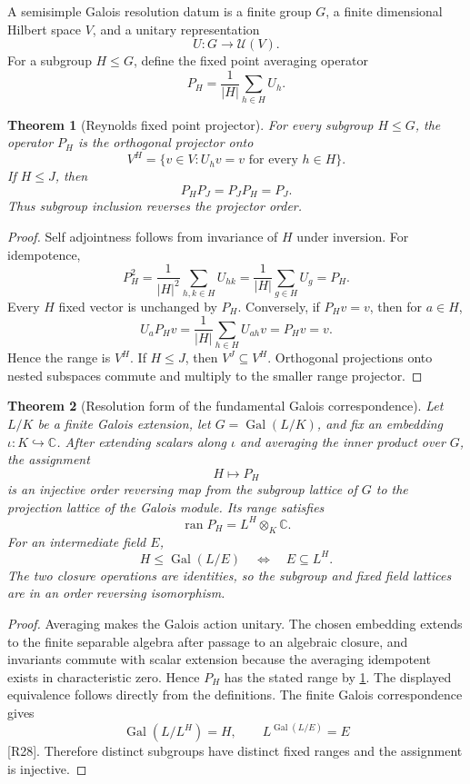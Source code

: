 \documentclass{aomart}
\newtheorem{theorem}{Theorem}[section]
\theoremstyle{definition}
\theoremstyle{remark}
\newcommand{\CC}{\mathbb C}
\newcommand{\ran}{\operatorname{ran}}
\newcommand{\Gal}{\operatorname{Gal}}
\newcommand{\Rcite}[1]{\textup{[#1]}}
\begin{document}
\begin{definition}\label{def:galois_resolution_datum}
A semisimple Galois resolution datum is a finite group \(G\), a finite dimensional Hilbert space \(V\), and a unitary representation
\[
 U:G\longrightarrow\mathcal U(V).
\]
For a subgroup \(H\leq G\), define the fixed point averaging operator
\[
 \boxed{
 P_H
 =
 \frac1{|H|}\sum_{h\in H}U_h.
 }
\]
\end{definition}

\begin{theorem}[Reynolds fixed point projector]\label{thm:reynolds_projector}
For every subgroup \(H\leq G\), the operator \(P_H\) is the orthogonal projector onto
\[
 V^H
 =
 \{v\in V:U_hv=v\text{ for every }h\in H\}.
\]
If \(H\leq J\), then
\[
 \boxed{
 P_HP_J=P_JP_H=P_J.
 }
\]
Thus subgroup inclusion reverses the projector order.
\end{theorem}

\begin{proof}
Self adjointness follows from invariance of \(H\) under inversion. For idempotence,
\[
 P_H^2
 =
 \frac1{|H|^2}\sum_{h,k\in H}U_{hk}
 =
 \frac1{|H|}\sum_{g\in H}U_g
 =P_H.
\]
Every \(H\) fixed vector is unchanged by \(P_H\). Conversely, if \(P_Hv=v\), then for \(a\in H\),
\[
 U_aP_Hv
 =
 \frac1{|H|}\sum_{h\in H}U_{ah}v
 =P_Hv=v.
\]
Hence the range is \(V^H\). If \(H\leq J\), then \(V^J\subseteq V^H\). Orthogonal projections onto nested subspaces commute and multiply to the smaller range projector.
\end{proof}

\begin{theorem}[Resolution form of the fundamental Galois correspondence]\label{thm:resolution_galois_correspondence}
Let \(L/K\) be a finite Galois extension, let \(G=\Gal(L/K)\), and fix an embedding \(\iota:K\hookrightarrow\CC\). After extending scalars along \(\iota\) and averaging the inner product over \(G\), the assignment
\[
 \boxed{
 H\longmapsto P_H
 }
\]
is an injective order reversing map from the subgroup lattice of \(G\) to the projection lattice of the Galois module. Its range satisfies
\[
 \boxed{
 \ran P_H
 =
 L^H\otimes_K\CC.
 }
\]
For an intermediate field \(E\),
\[
 \boxed{
 H\leq\Gal(L/E)
 \quad\Longleftrightarrow\quad
 E\subseteq L^H.
 }
\]
The two closure operations are identities, so the subgroup and fixed field lattices are in an order reversing isomorphism.
\end{theorem}

\begin{proof}
Averaging makes the Galois action unitary. The chosen embedding extends to the finite separable algebra after passage to an algebraic closure, and invariants commute with scalar extension because the averaging idempotent exists in characteristic zero. Hence \(P_H\) has the stated range by \cref{thm:reynolds_projector}. The displayed equivalence follows directly from the definitions. The finite Galois correspondence gives
\[
 \Gal(L/L^H)=H,
 \qquad
 L^{\Gal(L/E)}=E
\]
\Rcite{R28}. Therefore distinct subgroups have distinct fixed ranges and the assignment is injective.
\end{proof}
\end{document}
